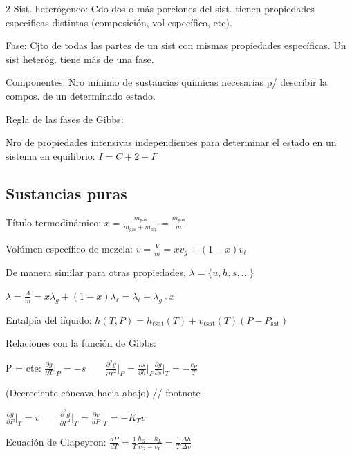 \documentclass[9pt]{article}
\begin{document}
\begin{multicols}{2}
Sist. heterógeneo: Cdo dos o más porciones del sist. tienen propiedades especificas distintas (composición, vol específico, etc).

Fase: Cjto de todas las partes de un sist con mismas propiedades específicas. Un sist heteróg. tiene más de una fase.

Componentes: Nro mínimo de sustancias químicas necesarias p/ describir la compos. de un determinado estado.

Regla de las fases de Gibbs:

Nro de propiedades intensivas independientes para determinar el estado en un sistema en equilibrio: $I = C + 2 - F$

\subsection{Sustancias puras}

Título termodinámico: $\displaystyle x = \frac{m_\text{gas}}{m_\text{gas}+m_\text{líq.}}=\frac{m_\text{gas}}{m}$

Volúmen específico de mezcla: $\displaystyle v = \frac{V}{m}=xv_g+(1-x)v_\ell$

De manera similar para otras propiedades, $\lambda = \{u,h,s,\dots\}$

$\displaystyle \lambda = \frac{\Lambda}{m}=x\lambda_g+(1-x)\lambda_\ell = \lambda_\ell +\lambda_{g\ell}x$

Entalpía del líquido: $\displaystyle h(T,P) = h_{\ell\text{sat}}(T)+v_{\ell\text{sat}}(T)(P-P_\text{sat})$

Relaciones con la función de Gibbs:

\vspace{2mm}


P = cte: $\displaystyle \frac{\partial g}{\partial T}\biggr\rvert_{P}= -s \qquad \frac{\partial^2 g}{\partial T^2}\biggr\rvert_{P}= \frac{\partial s}{\partial h}\biggr\rvert_{P}\frac{\partial g}{\partial s}\biggr\rvert_{T} = -\frac{c_P}{T}$



(Decreciente cóncava hacia abajo) // footnote

$\displaystyle \frac{\partial g}{\partial P}\biggr\rvert_{T} = v \qquad \frac{\partial^2 g}{\partial P^2}\biggr\rvert_{T} = \frac{\partial v}{dP}\biggr\rvert_{T} = -K_Tv$

Ecuación de Clapeyron: $\displaystyle \frac{dP}{dT} = \frac{1}{T} \frac{h_G-h_L}{v_G-v_L}= \frac{1}{T} \frac{\Delta h}{\Delta v}$

\vspace{2mm}


\end{multicols}
\end{document}
